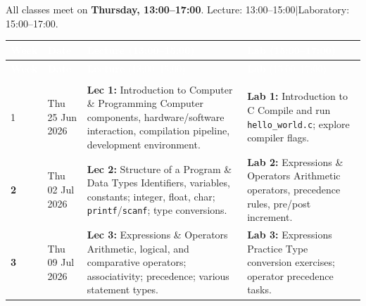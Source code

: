 \documentclass[11pt,a4paper]{article}
\begin{document}
\noindent All classes meet on \textbf{Thursday, 13:00--17:00}.\quad
Lecture: 13:00--15:00\quad$|$\quad Laboratory: 15:00--17:00.

\vspace{6pt}
\renewcommand{\arraystretch}{1.25}
\setlength{\tabcolsep}{4pt}

\begin{longtable}{@{}
    >{\centering\bfseries}p{1.0cm}
    >{\centering}p{2.4cm}
    >{\RaggedRight}p{5.2cm}
    >{\RaggedRight}p{5.0cm}
  @{}}
  \toprule
  \rowcolor{kmutnbBlue!90}
  \textcolor{white}{\textbf{Week}} &
  \textcolor{white}{\textbf{Date}} &
  \textcolor{white}{\textbf{Lecture} \small(13:00--15:00)} &
  \textcolor{white}{\textbf{Lab} \small(15:00--17:00)} \\
  \midrule
  \endfirsthead
  \toprule
  \rowcolor{kmutnbBlue!90}
  \textcolor{white}{\textbf{Week}} &
  \textcolor{white}{\textbf{Date}} &
  \textcolor{white}{\textbf{Lecture} \small(13:00--15:00)} &
  \textcolor{white}{\textbf{Lab} \small(15:00--17:00)} \\
  \midrule
  \endhead
  \midrule
  \multicolumn{4}{r}{\small\itshape continued on next page}\\
  \endfoot
  \bottomrule
  \endlastfoot

  1 & Thu 25 Jun 2026
    & \textbf{Lec 1:} Introduction to Computer \& Programming\newline
      \small Computer components, hardware/software interaction, compilation pipeline,
             development environment.
    & \textbf{Lab 1:} Introduction to C\newline
      \small Compile and run \texttt{hello\_world.c}; explore compiler flags. \\

  \rowcolor{lightGray}
  2 & Thu 02 Jul 2026
    & \textbf{Lec 2:} Structure of a Program \& Data Types\newline
      \small Identifiers, variables, constants; integer, float, char;
             \texttt{printf}/\texttt{scanf}; type conversions.
    & \textbf{Lab 2:} Expressions \& Operators\newline
      \small Arithmetic operators, precedence rules, pre/post increment. \\

  3 & Thu 09 Jul 2026
    & \textbf{Lec 3:} Expressions \& Operators\newline
      \small Arithmetic, logical, and comparative operators; associativity;
             precedence; various statement types.
    & \textbf{Lab 3:} Expressions Practice\newline
      \small Type conversion exercises; operator precedence tasks. \\


\end{longtable}
\end{document}
